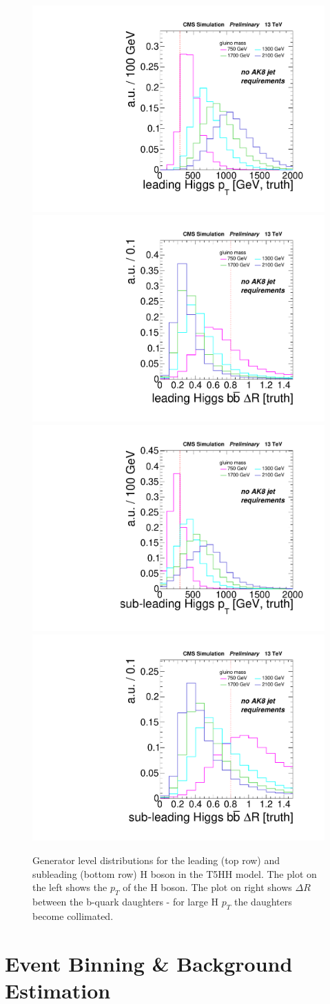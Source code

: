 \begin{figure}[hbp!]
\centering
\includegraphics[width=0.45\linewidth]{figs/leadHiggsPt.pdf}
\includegraphics[width=0.45\linewidth]{figs/leadHiggsDr.pdf}\\
\includegraphics[width=0.45\linewidth]{figs/subleadHiggsPt.pdf}
\includegraphics[width=0.45\linewidth]{figs/subleadHiggsDr.pdf}\\
\caption{
Generator level distributions for the leading (top row) and subleading (bottom row) H boson in the T5HH model. The plot on the left shows the $p_{T}$ of the H boson. The plot on right shows $\Delta R$ between the b-quark daughters - for large H $p_{T}$ the daughters become collimated.
}
\label{fig:GenHiggsBoost}
\end{figure}

\section{Event Binning \& Background Estimation}


